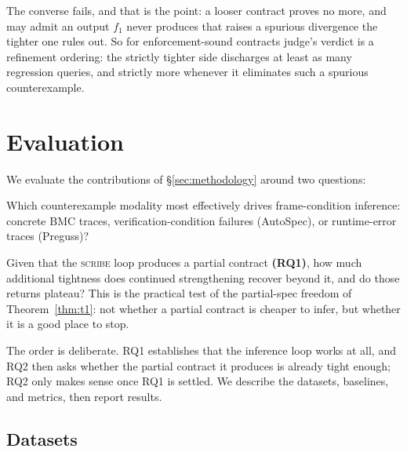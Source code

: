 \documentclass[conference]{IEEEtran}
\theoremstyle{definition}
\theoremstyle{remark}
\begin{document}
The converse fails, and that is the point: a looser contract proves
no more, and may admit an output $f_1$ never produces that raises a
spurious divergence the tighter one rules out. So for
enforcement-sound contracts judge's verdict is a refinement ordering:
the strictly tighter side discharges at least as many regression
queries, and strictly more whenever it eliminates such a spurious
counterexample.

\section{Evaluation}\label{sec:eval}

We evaluate the contributions of \S\ref{sec:methodology} around two
questions:

\begin{tcolorbox}[mybox,title=RQ1 - Feedback Modality]
  Which counterexample modality most effectively drives frame-condition
  inference: concrete BMC traces, verification-condition failures
  (AutoSpec), or runtime-error traces (Preguss)?
\end{tcolorbox}

\begin{tcolorbox}[mybox,title=RQ2 - Tractability]
  Given that the \textsc{scribe} loop produces a partial contract
  \textbf{(RQ1)}, how much
  additional tightness does continued strengthening recover beyond it,
  and do those returns plateau? This is the practical test of the
  partial-spec freedom of Theorem~\ref{thm:t1}: not whether a partial
  contract is cheaper to infer, but whether it is a good place to stop.
\end{tcolorbox}

The order is deliberate. RQ1 establishes that the inference loop
works at all, and RQ2
then asks whether the partial contract it produces is already tight
enough; RQ2 only makes sense once RQ1 is settled. We describe the
datasets, baselines, and metrics, then report results.

\subsection{Datasets}
\end{document}
